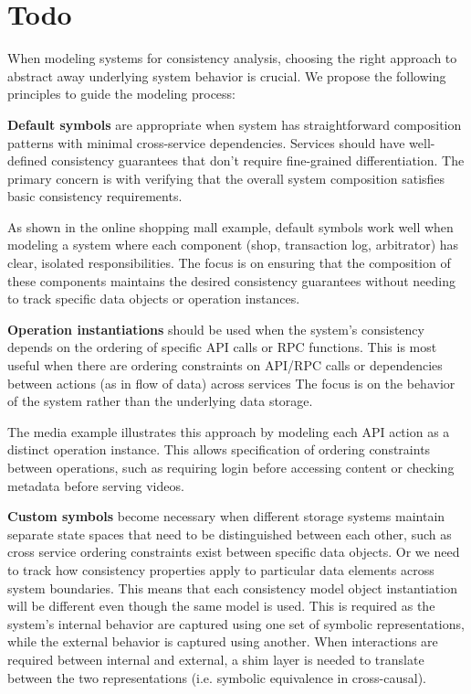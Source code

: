 \section{Todo}


When modeling systems for consistency analysis, choosing the right
approach to abstract away underlying system behavior is crucial.
We propose the following principles to guide the modeling process:

\textbf{Default symbols} are appropriate when system has straightforward
composition patterns with minimal cross-service dependencies.
Services should have well-defined consistency guarantees that don't
require fine-grained differentiation.
The primary concern is with verifying that the overall system
composition satisfies basic consistency requirements.

As shown in the online shopping mall example, default symbols work well when
modeling a system where each component (shop, transaction log,
arbitrator) has clear, isolated responsibilities. The focus is on
ensuring that the composition of these components maintains the
desired consistency guarantees without needing to track specific data
objects or operation instances.

\textbf{Operation instantiations} should be used
when the system's consistency depends on the ordering of specific API
calls or RPC functions.
This is most useful when there are ordering constraints on API/RPC
calls or dependencies between actions (as in flow of data) across services
The focus is on the behavior of the system rather than the underlying
data storage.

The media example illustrates this approach by modeling each API
action as a distinct operation instance. This allows specification of
ordering constraints between operations,
such as requiring login before accessing content or checking metadata
before serving videos.

\textbf{Custom symbols} become necessary when different storage
systems maintain separate state spaces that need to
be distinguished between each other, such as cross service ordering
constraints exist between specific data objects.
Or we need to track how consistency properties apply to particular data
elements across system boundaries. This means that each consistency model
object instantiation will be different even though the same model is used.
This is required as the system's internal behavior are captured using one set
of symbolic representations, while the external behavior is captured using
another. When interactions are required between internal and external, a shim
layer is needed to translate between the two representations (i.e.
symbolic equivalence in cross-causal).

